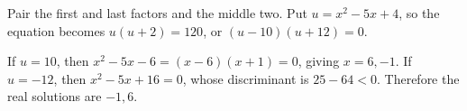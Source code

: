 Pair the first and last factors and the middle two. Put $u=x^2-5x+4$, so the equation becomes $u(u+2)=120$, or $(u-10)(u+12)=0$.

If $u=10$, then $x^2-5x-6=(x-6)(x+1)=0$, giving $x=6,-1$. If $u=-12$, then $x^2-5x+16=0$, whose discriminant is $25-64<0$. Therefore the real solutions are $\boxed{-1,6}$.
